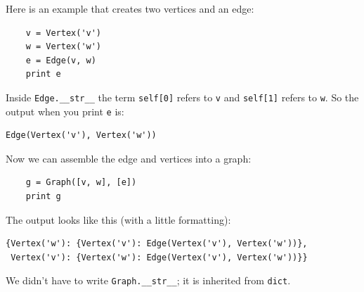 \documentclass[10pt]{book}
\begin{document}
Here is an example that creates two vertices and an edge:
%
\begin{verbatim}
    v = Vertex('v')
    w = Vertex('w')
    e = Edge(v, w)
    print e
\end{verbatim}
%
Inside \verb"Edge.__str__" the term {\tt self[0]} refers
to {\tt v} and {\tt self[1]} refers to {\tt w}.  So the output
when you print {\tt e} is:
%
\begin{verbatim}
Edge(Vertex('v'), Vertex('w'))
\end{verbatim}
%
Now we can assemble the edge and vertices into a graph:
%
\begin{verbatim}
    g = Graph([v, w], [e])
    print g
\end{verbatim}
%
The output looks like this (with a little formatting):
%
\begin{verbatim}
{Vertex('w'): {Vertex('v'): Edge(Vertex('v'), Vertex('w'))},
 Vertex('v'): {Vertex('w'): Edge(Vertex('v'), Vertex('w'))}}
\end{verbatim}
%
We didn't have to write \verb"Graph.__str__"; it is inherited
from {\tt dict}.
\end{document}
